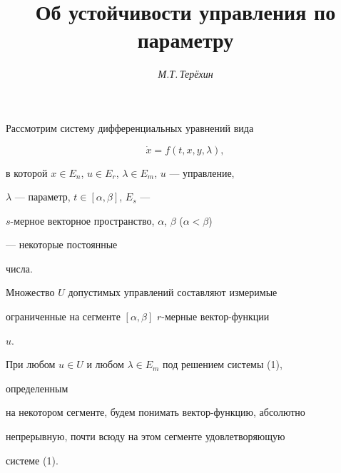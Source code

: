 \author{\it М.Т.\,Тер\"ехин} 




\title{ Об устойчивости управления по параметру} 


 


\date{} 




\pagestyle{plain} %


 




\maketitle 


\label{begin} 


 


Рассмотрим систему дифференциальных уравнений вида 


\begin{equation} 


\Dot x=f(t,x,y,\lambda), 


\end{equation} 


в которой $x\in E_n$, $u\in E_r$, $\lambda\in E_m$, $u$ --- управление, 


$\lambda$ --- параметр, $t\in[\alpha,\beta]$, $E_s$ --- 


$s$-мерное векторное пространство, $\alpha$, $\beta$ ($\alpha<\beta$) 


--- некоторые постоянные 


числа. 


Множество $U$ допустимых управлений составляют измеримые 


ограниченные на сегменте $[\alpha,\beta]$\; $r$-мерные вектор-функ\-ции 


$u$. 


При любом $u\in U$ и любом $\lambda\in E_m$ под решением системы (1), 


определенным 


на некотором сегменте, будем понимать вектор-функцию, абсолютно 


непрерывную, почти всюду на этом сегменте удовлетворяющую 


системе (1). 


